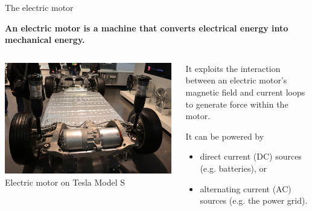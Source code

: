 \begin{frame}{The electric motor}

{\bf An electric motor is a machine that converts electrical energy into mechanical energy.}

\begin{columns}
  \begin{column}{0.50\textwidth}
   {\scriptsize
     \begin{center}
           \includegraphics[width=0.99\textwidth]{./images/photos/tesla_car_electric_motor.jpg}\\
           Electric motor on Tesla Model S
     \end{center}
   }
  \end{column}
  \begin{column}{0.50\textwidth}
    \begin{itemize}
    {\small
      \item It exploits the interaction between an electric motor's magnetic field
            and current loops to generate force within the motor.
      \item It can be powered by
              \begin{itemize}
                  \item direct current (DC) sources (e.g. batteries), or
                  \item alternating current (AC) sources (e.g. the power grid).
             \end{itemize}
    }
    \end{itemize}
  \end{column}
\end{columns}

\end{frame}

